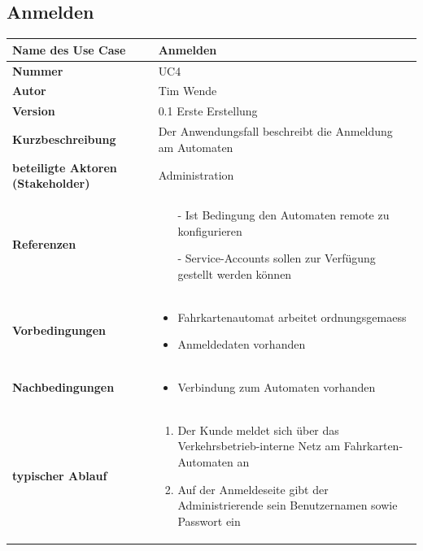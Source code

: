 \documentclass{article}
\begin{document}
    \subsection{Anmelden}
    \begin{tabularx}{\textwidth}{|l|X|}
        \hline        
        \textcolor{fhmint}{\textbf{Name des Use Case}} & \LARGE\textcolor{fhmint}{\textbf{Anmelden}}\\
        \hline
        \textbf{Nummer} & UC4 \\\hline
        \textbf{Autor} & Tim Wende \\\hline
        \textbf{Version} & 0.1 Erste Erstellung \\\hline
        \textbf{Kurzbeschreibung} & Der Anwendungsfall beschreibt die Anmeldung am Automaten \\\hline
        \textbf{beteiligte Aktoren (\gls{Stakeholder})} & \gls{Administration} \\\hline
        \textbf{Referenzen} & \begin{itemize}
            \item[-] Ist Bedingung den Automaten \gls{remote} zu konfigurieren
            \item[-] \gls{Service-Accounts} sollen zur Verfügung gestellt werden können
        \end{itemize} \\\hline
        \textbf{Vorbedingungen} & \begin{itemize}
            \item Fahrkartenautomat arbeitet \gls{ordnungsgemaess}
            \item Anmeldedaten vorhanden
        \end{itemize} \\\hline
        \textbf{Nachbedingungen} & \begin{itemize}
            \item Verbindung zum Automaten vorhanden
        \end{itemize} \\\hline
        \textbf{typischer Ablauf} & \begin{enumerate}
            \item Der \gls{Kunde} meldet sich über das Verkehrsbetrieb-interne \gls{Netz} am Fahrkarten-Automaten an
            \item Auf der Anmeldeseite gibt der Administrierende sein Benutzernamen sowie Passwort ein
        \end{enumerate} \\\hline

\end{tabularx}
\end{document}
